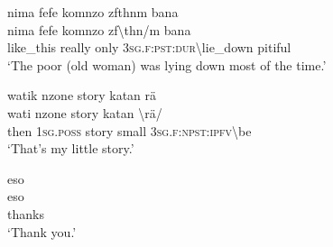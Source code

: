 \ea\label{ex:14:a3238}
nima fefe komnzo zfthnm bana\\
\gll nima	fefe	komnzo	zf{\textbackslash}thn/m	bana\\
     like\_this	really	only	3\textsc{sg}.\textsc{f}:\textsc{pst}:\textsc{dur}{\textbackslash}lie\_down	pitiful\\
\glt `The poor (old woman) was lying down most of the time.'
\z

\ea\label{ex:14:a3239}
watik nzone story katan rä\\
\gll wati	nzone	story	katan	{\textbackslash}rä/\\
     then	1\textsc{sg}.\textsc{poss}	story	small	3\textsc{sg}.\textsc{f}:\textsc{npst}:\textsc{ipfv}{\textbackslash}be\\
\glt `That's my little story.'
\z

\ea\label{ex:14:a3240}
eso\\
\gll eso\\
     thanks\\
\glt `Thank you.'
\z

